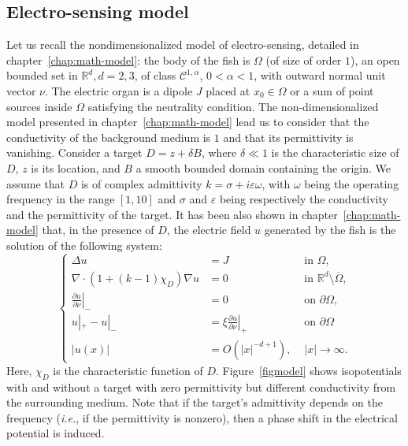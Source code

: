 \label{sec:GPT-pnas}

\subsection{Electro-sensing model}
\label{sub:recall-model}
Let us recall the nondimensionalized model of electro-sensing, detailed in
chapter~\ref{chap:math-model}: the
body of the fish is $\Omega$ (of size of order $1$), an open
bounded set in $\mathbb{R}^d, d=2,3$, of class
$\mathcal{C}^{1,\alpha}$, $0<\alpha<1$, with outward normal unit
vector $\nu$. The electric organ is a dipole $J$ placed at
$x_0\in\Omega$ or a sum of point sources inside $\Omega$
satisfying the neutrality condition. The non-dimensionalized model presented in
chapter~\ref{chap:math-model} lead us to consider that the conductivity of the
background medium is $1$ and that its permittivity is vanishing.
Consider a target $D=z+\delta B$, where $\delta \ll 1$ is the
characteristic size of $D$, $z$ is its location, and $B$ a smooth
bounded domain containing the origin. We assume that $D$ is of
complex admittivity $k=\sigma+i\varepsilon\omega$, with $\omega$
being the operating frequency in the range $[1,10]$ and $\sigma$
and $\varepsilon$ being respectively the conductivity and the
 permittivity of the target. It has been also shown in chapter~\ref{chap:math-model} that, in the
presence of $D$,
 the electric
field $u$ generated by the fish is the solution of the following
system:
\begin{equation}
\left\{ \begin{alignedat}{2}\Delta u & =J & \,\, \mbox{in } \Omega,\\
\nabla\cdot(1+(k-1)\chi_{D})\nabla u & =0 & \,\,   \mbox{in } \mathbb{R}^{d}\setminus\overline{\Omega},\\
\left.\frac{\partial u}{\partial\nu}\right|_{-} & =0 & \,\, \mbox{on } \partial\Omega,\\
{} u |_+ - u|_- & =\xi\left.\frac{\partial u}{\partial\nu}\right|_{+} & \,\, \mbox{on } \partial\Omega\\
\left|u(x)\right| & =O(\vert x\vert^{-d+1}), &
\,\,\left|x\right|\rightarrow\infty.
\end{alignedat}
\right.\label{eq:system-u}
\end{equation}
Here, $\chi_{D}$ is the characteristic function of $D$.
Figure~\ref{figmodel} shows
 isopotentials with and without a target with zero permittivity but different conductivity from the surrounding
medium. Note that if the target's admittivity depends on the
frequency ({\it i.e.}, if the permittivity is nonzero), then a
phase shift in the electrical potential is induced.


